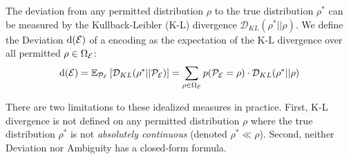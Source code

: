 The deviation from any permitted distribution $\rho$ to the true distribution $\rho^*$ can be measured by the Kullback-Leibler (K-L) divergence $\mathcal{D}_{KL}(\rho^*||\rho)$.
We define the Deviation $\text{d}(\mathcal E)$ of a encoding as the expectation of the K-L divergence over all permitted $\rho \in \Omega_\mathcal E$:
$$\text{d}(\mathcal E)=\mathbb{E}_{\mathcal{P}_\mathcal E}\left[\mathcal{D}_{KL}(\rho^*||\mathcal{P}_\mathcal E)\right] = \sum_{\rho \in \Omega_\mathcal E} p(\mathcal P_\mathcal E = \rho) \cdot \mathcal{D}_{KL}(\rho^*||\rho)$$



There are two limitations to these idealized measures in practice.
First, K-L divergence is not defined on any permitted distribution $\rho$ where the true distribution $\rho^*$ is not \emph{absolutely continuous} (denoted $\rho^*\ll\rho$). 
Second, neither Deviation nor Ambiguity has a closed-form formula. 
